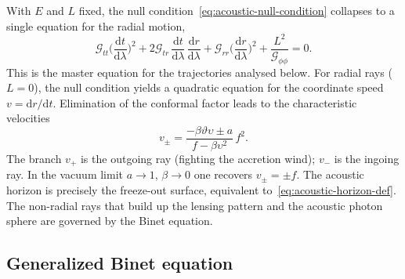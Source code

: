 \documentclass[12pt,a4paper,preprint]{elsarticle}
\begin{document}
            With $E$ and $L$ fixed, the null condition~\eqref{eq:acoustic-null-condition} collapses to a single equation for the radial motion,
            \begin{equation}
                \mathcal{G}_{tt}\Biggl(\frac{\mathrm{d}t}{\mathrm{d}\lambda}\Biggr)^{2} + 2\mathcal{G}_{tr}\,\frac{\mathrm{d}t}{\mathrm{d}\lambda}\,\frac{\mathrm{d}r}{\mathrm{d}\lambda} + \mathcal{G}_{rr}\Biggl(\frac{\mathrm{d}r}{\mathrm{d}\lambda}\Biggr)^{2} + \frac{L^{2}}{\mathcal{G}_{\phi\phi}} = 0 .
                \label{eq:null-interval-expanded}
            \end{equation}
            This is the master equation for the trajectories analysed below. For radial rays ($L=0$), the null condition yields a quadratic equation for the coordinate speed $v=\mathrm{d}r/\mathrm{d}t$. Elimination of the conformal factor leads to the characteristic velocities
            \begin{equation}
                v_{\pm} = \frac{-\beta\vartheta\upsilon \pm a}{f - \beta\upsilon^{2}}\, f^{2} .
                \label{eq:coordinate-velocity}
            \end{equation}
            The branch $v_{+}$ is the outgoing ray (fighting the accretion wind); $v_{-}$ is the ingoing ray. In the vacuum limit $a\to 1$, $\beta\to 0$ one recovers $v_{\pm}=\pm f$. The acoustic horizon is precisely the freeze-out surface, equivalent to~\eqref{eq:acoustic-horizon-def}. The non-radial rays that build up the lensing pattern and the acoustic photon sphere are governed by the Binet equation.

        \subsection{Generalized Binet equation}\label{subsec:binet-equation}
\end{document}
